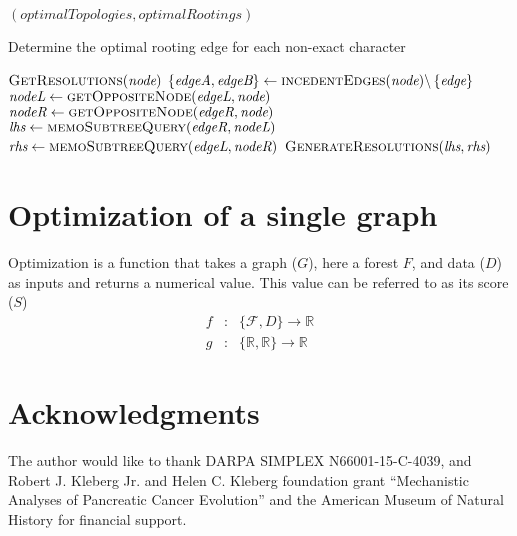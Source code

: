 \documentclass[12pt]{article}
\begin{document}
{\begin{algorithm}
\begin{algorithmic}[1]
		\EndFor		
		
		\State \Return $(optimalTopologies, optimalRootings)$

		\EndFunction
	\end{algorithmic}
\end{algorithm}


\begin{algorithm}
	\caption{Determine the optimal rooting edge for each non-exact character}
	\label{Alg:generate-resolutions}
	\begin{algorithmic}[1]
		  \State \Return $\Call{GetResolutions}{\textit{node}}$
		\EndIf
		\State $\left\{ \textit{edgeA}, \textit{edgeB} \right\} \gets \Call{incedentEdges}{\textit{node}} \backslash \left\{ \textit{edge} \right\}$
		\State $\textit{nodeL} \gets \Call{getOppositeNode}{ \textit{edgeL}, \textit{node} }$
		\State $\textit{nodeR} \gets \Call{getOppositeNode}{ \textit{edgeR}, \textit{node} }$
		\State $\textit{lhs} \gets \Call{memoSubtreeQuery}{\textit{edgeR},\textit{nodeL}}$
		\State $\textit{rhs} \gets \Call{memoSubtreeQuery}{\textit{edgeL},\textit{nodeR}}$
		\State \Return $\Call{GenerateResolutions}{\textit{lhs}, \textit{rhs}}$
		\EndFunction
	\end{algorithmic}
\end{algorithm}
\restoregeometry
}


\section{Optimization of a single graph}\label{Optimization of a single graph}

Optimization is a function that takes a graph ($G$), here a forest $F$, and data ($D$) as inputs and returns a numerical value.  
This value can be referred to as its score ($S$)
 	\begin{eqnarray*}
 		f & : &  \{\mathcal{F}, D\} \rightarrow \mathbb{R}\\
		g & : & \{  \mathbb{R},  \mathbb{R} \} \rightarrow \mathbb{R}
	 \end{eqnarray*}
 

\section*{Acknowledgments}
The author would like to thank DARPA SIMPLEX N66001-15-C-4039, and Robert J. Kleberg Jr. and Helen C. Kleberg foundation grant ``Mechanistic Analyses of Pancreatic Cancer Evolution'' and the American Museum of Natural History for financial support. 

%
%
\newpage
%

%
\end{document}

